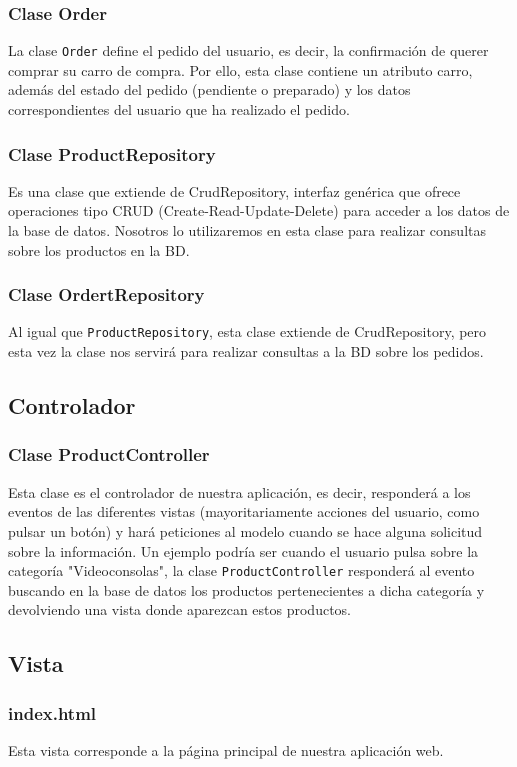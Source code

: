 \documentclass[10pt,a4paper,svgnames]{article}
\begin{document}
\subsubsection{Clase Order}
La clase \texttt{Order} define el pedido del usuario, es decir, la confirmación de querer comprar su carro de compra. Por ello, esta clase contiene un atributo carro, además del estado del pedido (pendiente o preparado) y los datos correspondientes del usuario que ha realizado el pedido.\\
\subsubsection{Clase ProductRepository}
Es una clase que extiende de CrudRepository, interfaz genérica que ofrece operaciones tipo CRUD (Create-Read-Update-Delete) para acceder a los datos de la base de datos. Nosotros lo utilizaremos en esta clase para realizar consultas sobre los productos en la BD.\\
\subsubsection{Clase OrdertRepository}
Al igual que \texttt{ProductRepository}, esta clase extiende de CrudRepository, pero esta vez la clase nos servirá para realizar consultas a la BD sobre los pedidos.\\
\subsection{Controlador}
\subsubsection{Clase ProductController}
Esta clase es el controlador de nuestra aplicación, es decir, responderá a los eventos de las diferentes vistas (mayoritariamente acciones del usuario, como pulsar un botón) y hará peticiones al modelo cuando se hace alguna solicitud sobre la información.
Un ejemplo podría ser cuando el usuario pulsa sobre la categoría "Videoconsolas", la clase \texttt{ProductController} responderá al evento buscando en la base de datos los productos pertenecientes a dicha categoría y devolviendo una vista donde aparezcan estos productos.\\
\subsection{Vista}
\subsubsection{index.html}
Esta vista corresponde a la página principal de nuestra aplicación web.
\end{document}
